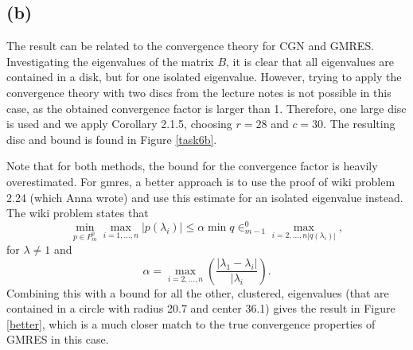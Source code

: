 \subsection*{(b)}
The result can be related to the convergence theory for CGN and GMRES. Investigating the eigenvalues of the matrix $B$, it is clear that all eigenvalues are contained in a disk, but for one isolated eigenvalue. However, trying to apply the convergence theory with two discs from the lecture notes is not possible in this case, as the obtained convergence factor is larger than 1. Therefore, one large disc is used and we apply Corollary 2.1.5, choosing $r = 28$ and $c =30 $. The resulting disc and bound is found in Figure \ref{task6b}.

Note that for both methods, the bound for the convergence factor is heavily overestimated. For gmres, a better approach is to use the proof of wiki problem 2.24 (which Anna wrote) and use this estimate for an isolated eigenvalue instead. The wiki problem states that 
\begin{equation}
\min_{p\in P_m^0}\max_{i = 1,\dots,n}|p(\lambda_i)|\leq \alpha \min q\in_{m-1}^0\max_{i = 2,\dots,n|q(\lambda_i)|},
\end{equation}
for $\lambda\neq 1$ and 
\begin{equation}
\alpha  = \max_{i = 2,\dots, n}\left(\frac{|\lambda_1-\lambda_i|}{|\lambda_i}\right).
\end{equation}
Combining this with a bound for all the other, clustered, eigenvalues (that are contained in a circle with radius 20.7 and center 36.1) gives the result in Figure \ref{better}, which is a much closer match to the true convergence properties of GMRES in this case. 

